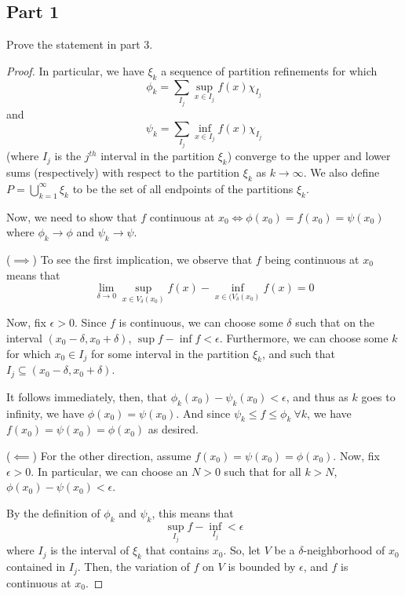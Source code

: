 \documentclass[fontsize=11pt]{scrartcl} %
\numberwithin{equation}{section} %
\numberwithin{figure}{section} %
\numberwithin{table}{section} %
\theoremstyle{definition}
\begin{document}
\subsection*{Part 1}
Prove the statement in part 3.
\\
\begin{proof}
In particular, we have $\xi_k$ a sequence of partition refinements for which
\[
\phi_k = \sum_{I_j}\sup_{x\in I_j}f(x)\chi_{I_j}
\]
and
\[
\psi_k = \sum_{I_j}\inf_{x\in I_j}f(x)\chi_{I_j}
\]
(where $I_j$ is the $j^{th}$ interval in the partition $\xi_k$) converge to the
upper and lower sums (respectively) with respect to the partition $\xi_k$ as $k\to\infty$.
We also define $P=\bigcup_{k=1}^{\infty}\xi_k$ to be the set of all endpoints of the partitions $\xi_k$.

Now, we need to show that $f$ continuous at $x_0 \iff \phi(x_0) = f(x_0) = \psi(x_0)$ where
$\phi_k\to\phi$ and $\psi_k\to\psi$.

($\implies$)
To see the first implication, we observe that $f$ being continuous at $x_0$ means that
\[
\lim_{\delta\to 0}\sup_{x\in V_{\delta}(x_0)}f(x) - \inf_{x\in(V_{\delta}(x_0)}f(x) = 0
\]

Now, fix $\epsilon > 0$. Since $f$ is continuous, we can choose some $\delta$ such that
on the interval $(x_0-\delta,x_0+\delta)$, $\sup f -\inf f < \epsilon$. Furthermore,
we can choose some $k$ for which $x_0\in I_j$ for some interval in the partition $\xi_k$, and
such that $I_j\subseteq (x_0-\delta,x_0+\delta)$.

It follows immediately, then, that $\phi_k(x_0)-\psi_k(x_0)<\epsilon$, and thus as $k$
goes to infinity, we have $\phi(x_0)=\psi(x_0)$. And since $\psi_k \leq f\leq \phi_k\ \forall k$, 
we have $f(x_0) = \psi(x_0) = \phi(x_0)$ as desired.

($\impliedby$)
For the other direction, assume $f(x_0) = \psi(x_0) = \phi(x_0)$.
Now, fix $\epsilon >0$. In particular, we can choose an $N>0$ such that for all $k>N$,
$\phi(x_0)-\psi(x_0) <\epsilon$.

By the definition of $\phi_k$ and $\psi_k$, this means that
\[
\sup_{I_j}f - \inf_{I_j} < \epsilon
\]
where $I_j$ is the interval of $\xi_k$ that contains $x_0$. So, let $V$ be a $\delta$-neighborhood
of $x_0$ contained in $I_j$. Then, the variation of $f$ on $V$ is bounded by $\epsilon$, and
$f$ is continuous at $x_0$.
\end{proof}
\end{document}
